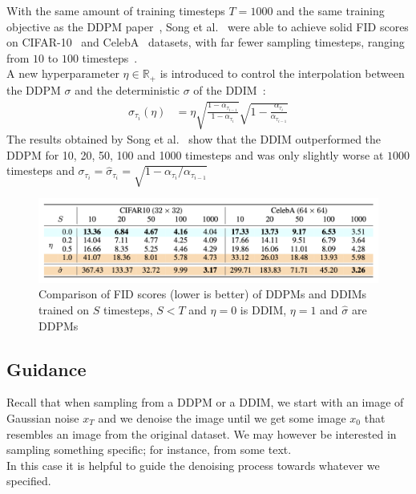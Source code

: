 \documentclass[twoside]{article}
\numberwithin{equation}{section}
\numberwithin{figure}{section}
\begin{document}
With the same amount of training timesteps $T = 1000$ and the same training objective as the DDPM paper~\cite{ho2020denoising}, Song et al.~\cite{song2022denoising} were able to achieve solid FID scores on CIFAR-10~\cite{cifar10} and CelebA~\cite{liu2015faceattributes} datasets, with far fewer sampling timesteps, ranging from $10$ to $100$ timesteps~\cite{song2022denoising}. \\
A new hyperparameter $\eta \in \mathbb{R}_+$ is introduced to control the interpolation between the DDPM $\sigma$ and the deterministic $\sigma$ of the DDIM~\cite{song2022denoising}:
\begin{align}
  \sigma_{\tau_i} (\eta) &= \eta \sqrt{\frac{1 - \alpha_{\tau_{i-1}}}{1 - \alpha_{\tau_i}}} \sqrt{1 - \frac{\alpha_{\tau_i}}{\alpha_{\tau_{i-1}}}}
\end{align}
The results obtained by Song et al.~\cite{song2022denoising} show that the DDIM outperformed the DDPM for 10, 20, 50, 100 and 1000 timesteps and was only slightly worse at $1000$ timesteps and $\sigma_{\tau_i} = \hat{\sigma}_{\tau_i} = \sqrt{1 - \alpha_{\tau_i} / \alpha_{\tau_{i-1}}}$

\begin{figure}[h]
  \begin{center}
    \includegraphics[width=\textwidth]{images/ddim_table.png}
    \caption{Comparison of FID scores (lower is better) of DDPMs and DDIMs trained on $S$ timesteps, $S < T$ and $\eta = 0$ is DDIM, $\eta = 1$ and $\hat{\sigma}$ are DDPMs \cite{song2022denoising}}
  \end{center}
\end{figure}



\subsection{Guidance}
Recall that when sampling from a DDPM or a DDIM, we start with an image of Gaussian noise $x_T$ and we denoise the image until we get some image $x_0$ that resembles an image from the original dataset. We may however be interested in sampling something specific; for instance, from some text. \\
In this case it is helpful to guide the denoising process towards whatever we specified.
\end{document}
